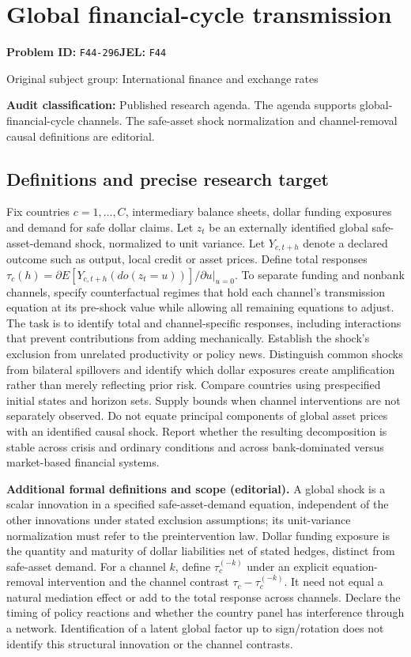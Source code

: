 \documentclass[11pt,a4paper]{article}
\begin{document}
\section*{Global financial-cycle transmission}
\textbf{Problem ID:} \texttt{F44-296}\quad \textbf{JEL:} \texttt{F44}\par
\label{problem:OP-0333}
{\sffamily\small\color{muted}Original subject group: International finance and exchange rates\par}
\label{definitions:problem:30007615}
\textbf{Audit classification:} Published research agenda. The agenda supports global-financial-cycle channels. The safe-asset shock normalization and channel-removal causal definitions are editorial.
\subsection*{Definitions and precise research target}
Fix countries \(c=1,\ldots,C\), intermediary balance sheets, dollar funding exposures and demand for safe dollar claims. Let \(z_t\) be an externally identified global safe-asset-demand shock, normalized to unit variance. Let \(Y_{c,t+h}\) denote a declared outcome such as output, local credit or asset prices. Define total responses \(\tau_c(h)=\partial E[Y_{c,t+h}(do(z_t=u))]/\partial u|_{u=0}\). To separate funding and nonbank channels, specify counterfactual regimes that hold each channel's transmission equation at its pre-shock value while allowing all remaining equations to adjust. The task is to identify total and channel-specific responses, including interactions that prevent contributions from adding mechanically. Establish the shock's exclusion from unrelated productivity or policy news. Distinguish common shocks from bilateral spillovers and identify which dollar exposures create amplification rather than merely reflecting prior risk. Compare countries using prespecified initial states and horizon sets. Supply bounds when channel interventions are not separately observed. Do not equate principal components of global asset prices with an identified causal shock. Report whether the resulting decomposition is stable across crisis and ordinary conditions and across bank-dominated versus market-based financial systems.

\textbf{Additional formal definitions and scope (editorial).} A global shock is a scalar innovation in a specified safe-asset-demand equation, independent of the other innovations under stated exclusion assumptions; its unit-variance normalization must refer to the preintervention law. Dollar funding exposure is the quantity and maturity of dollar liabilities net of stated hedges, distinct from safe-asset demand. For a channel \(k\), define \(\tau_c^{(-k)}\) under an explicit equation-removal intervention and the channel contrast \(\tau_c-\tau_c^{(-k)}\). It need not equal a natural mediation effect or add to the total response across channels. Declare the timing of policy reactions and whether the country panel has interference through a network. Identification of a latent global factor up to sign/rotation does not identify this structural innovation or the channel contrasts.
\end{document}
